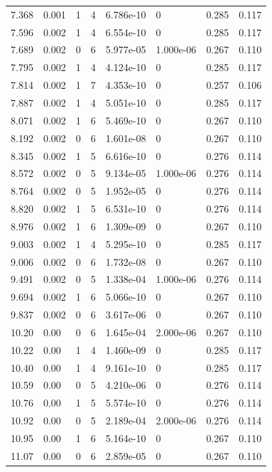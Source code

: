 \documentclass[preview]{standalone}
\begin{document}
{{\begin{tabular}{L{1.2cm}C{1.2cm} C{0.3cm}C{0.5cm} C{1.4cm}C{1.4cm} C{1.4cm}C{1.4cm}}
  7.368  &  0.001  & 1     &  4 &  6.786e-10  & 0  & 0.285 &  0.117   \\ 
  7.596  &  0.002  & 1     &  4 &  6.554e-10  & 0  & 0.285 &  0.117   \\ 
  7.689  &  0.002  & 0     &  6 &  5.977e-05  & 1.000e-06  & 0.267 &  0.110   \\ 
  7.795  &  0.002  & 1     &  4 &  4.124e-10  & 0  & 0.285 &  0.117   \\ 
  7.814  &  0.002  & 1     &  7 &  4.353e-10  & 0  & 0.257 &  0.106   \\ 
  7.887  &  0.002  & 1     &  4 &  5.051e-10  & 0  & 0.285 &  0.117   \\ 
  8.071  &  0.002  & 1     &  6 &  5.469e-10  & 0  & 0.267 &  0.110   \\ 
  8.192  &  0.002  & 0     &  6 &  1.601e-08  & 0  & 0.267 &  0.110   \\ 
  8.345  &  0.002  & 1     &  5 &  6.616e-10  & 0  & 0.276 &  0.114   \\ 
  8.572  &  0.002  & 0     &  5 &  9.134e-05  & 1.000e-06  & 0.276 &  0.114   \\ 
  8.764  &  0.002  & 0     &  5 &  1.952e-05  & 0  & 0.276 &  0.114   \\ 
  8.820  &  0.002  & 1     &  5 &  6.531e-10  & 0  & 0.276 &  0.114   \\ 
  8.976  &  0.002  & 1     &  6 &  1.309e-09  & 0  & 0.267 &  0.110   \\ 
  9.003  &  0.002  & 1     &  4 &  5.295e-10  & 0  & 0.285 &  0.117   \\ 
  9.006  &  0.002  & 0     &  6 &  1.732e-08  & 0  & 0.267 &  0.110   \\ 
  9.491  &  0.002  & 0     &  5 &  1.338e-04  & 1.000e-06  & 0.276 &  0.114   \\ 
  9.694  &  0.002  & 1     &  6 &  5.066e-10  & 0  & 0.267 &  0.110   \\ 
  9.837  &  0.002  & 0     &  6 &  3.617e-06  & 0  & 0.267 &  0.110   \\ 
  10.20  &  0.00  & 0     &  6 &  1.645e-04  & 2.000e-06  & 0.267 &  0.110   \\ 
  10.22  &  0.00  & 1     &  4 &  1.460e-09  & 0  & 0.285 &  0.117   \\ 
  10.40  &  0.00  & 1     &  4 &  9.161e-10  & 0  & 0.285 &  0.117   \\ 
  10.59  &  0.00  & 0     &  5 &  4.210e-06  & 0  & 0.276 &  0.114   \\ 
  10.76  &  0.00  & 1     &  5 &  5.574e-10  & 0  & 0.276 &  0.114   \\ 
  10.92  &  0.00  & 0     &  5 &  2.189e-04  & 2.000e-06  & 0.276 &  0.114   \\ 
  10.95  &  0.00  & 1     &  6 &  5.164e-10  & 0  & 0.267 &  0.110   \\ 
  11.07  &  0.00  & 0     &  6 &  2.859e-05  & 0  & 0.267 &  0.110   \\ 
\hline 
\end{tabular} 

}}
\end{document}

